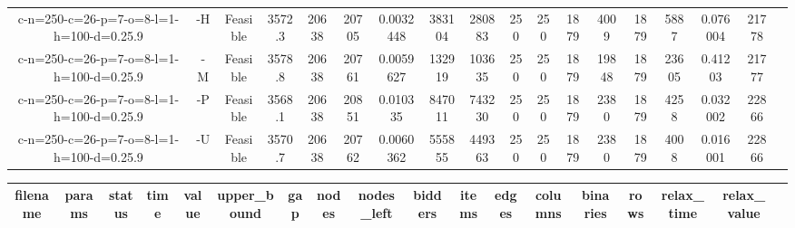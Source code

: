 \documentclass[landscape, a4paper]{article}
\begin{document}
\begin{center}
\begin{tabular}{@{}cccccccccccccccccc@{}}
c-n=250-c=26-p=7-o=8-l=1-h=100-d=0.25.9 & -H & Feasible & 3572.3 & 20638 & 20705 & 0.0032448 & 383104 & 280883 & 250 & 250 & 1879 & 4009 & 1879 & 5887 & 0.076004 & 21778 & \\
c-n=250-c=26-p=7-o=8-l=1-h=100-d=0.25.9 & -M & Feasible & 3578.8 & 20638 & 20761 & 0.0059627 & 132919 & 103635 & 250 & 250 & 1879 & 19848 & 1879 & 23605 & 0.41203 & 21777 & \\
c-n=250-c=26-p=7-o=8-l=1-h=100-d=0.25.9 & -P & Feasible & 3568.1 & 20638 & 20851 & 0.010335 & 847011 & 743230 & 250 & 250 & 1879 & 2380 & 1879 & 4258 & 0.032002 & 22866 & \\
c-n=250-c=26-p=7-o=8-l=1-h=100-d=0.25.9 & -U & Feasible & 3570.7 & 20638 & 20762 & 0.0060362 & 555855 & 449363 & 250 & 250 & 1879 & 2380 & 1879 & 4008 & 0.016001 & 22866 & \\
\end{tabular}
\end{center}
\begin{center}
\begin{tabular}{@{}cccccccccccccccccc@{}}
filename & params & status & time & value & upper\_bound & gap & nodes & nodes\_left & bidders & items & edges & columns & binaries & rows & relax\_time & relax\_value & \\
\hline
\end{tabular}
\end{center}
\end{document}
